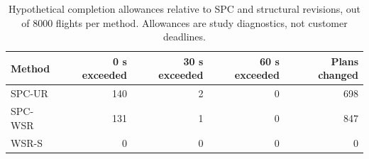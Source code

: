 \begin{table}[!htbp]
\centering\small
\caption{Hypothetical completion allowances relative to SPC and structural revisions, out of 8000 flights per method. Allowances are study diagnostics, not customer deadlines.}\label{tab:service-allowances}
\begin{tabularx}{\textwidth}{L R R R R}
\toprule
Method & 0 s exceeded & 30 s exceeded & 60 s exceeded & Plans changed\\\midrule
SPC-UR & 140 & 2 & 0 & 698\\
SPC-WSR & 131 & 1 & 0 & 847\\
WSR-S & 0 & 0 & 0 & 0\\
\bottomrule
\end{tabularx}
\end{table}
